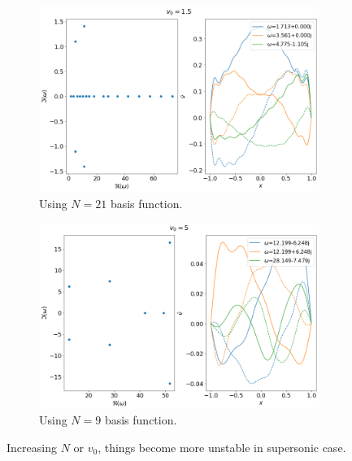 \documentclass{article}
\begin{document}
\begin{figure}[H]
    \centering
    \begin{subfigure}[b]{0.45\linewidth}
        \includegraphics[width=\linewidth]{img/results-sine-dvr-N=21,v0=1.5.png}
        \caption{Using $N=21$ basis function.}
    \end{subfigure}%
    \begin{subfigure}[b]{0.45\linewidth}
        \includegraphics[width=\linewidth]{img/results-sine-dvr-N=9,v0=5.png}
        \caption{Using $N=9$ basis function.}
    \end{subfigure}
    \caption{Increasing $N$ or $v_0$, things become more unstable in supersonic case.}
    \label{fig:results-sine-dvr-unstable}
\end{figure}
\end{document}
